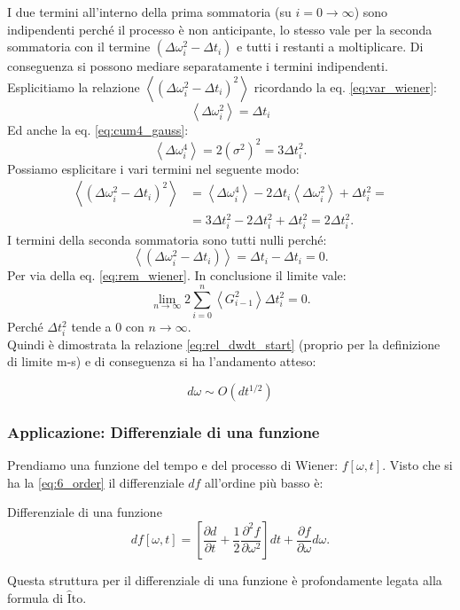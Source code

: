 I due termini all'interno della prima sommatoria (su $i = 0 \to \infty$) sono indipendenti perché il processo è non anticipante, lo stesso vale per la seconda sommatoria con il termine $\left(\Delta\omega^2_i - \Delta t_i\right)$ e tutti i restanti a moltiplicare. Di conseguenza si possono mediare separatamente i termini indipendenti.\\
Esplicitiamo la relazione $\left<\left(\Delta\omega_i^2 - \Delta  t_i\right)^2\right>$ ricordando la eq. \ref{eq:var_wiener}:
\begin{equation}
    \left<\Delta\omega_i^2\right> = \Delta t_i
    \label{eq:rem_wiener}
\end{equation}
Ed anche la eq. \ref{eq:cum4_gauss}:
\[
\left<\Delta\omega^4_i\right> = 2\left(\sigma^2\right)^2 = 3 \Delta t_i^2
.\] 
Possiamo esplicitare i vari termini nel seguente modo:
\[\begin{aligned}
    \left<\left(\Delta\omega_i^2 -\Delta t_i\right)^2\right> &= \left<\Delta\omega_i^4\right> - 2\Delta t_i\left< \Delta\omega_i^2\right> + \Delta t_i^2 = \\
    &=3\Delta t_i^2 - 2\Delta t_i^2 + \Delta t_i^2 = 2 \Delta t^2_i
.\end{aligned}\]
I termini della seconda sommatoria sono tutti nulli perché:
\[
    \left<\left(\Delta\omega_i^2-\Delta t_i\right)\right> = \Delta t_i - \Delta t_i = 0 
.\] 
Per via della eq. \ref{eq:rem_wiener}. In conclusione il limite vale:
\[
    \lim_{n \to \infty} 2\sum_{i = 0}^{n} \left<G_{i-1}^2\right> \Delta t_i^2 = 0
.\] 
Perché $\Delta t_i^2$ tende a $0$ con $n\to\infty$.\\
Quindi è dimostrata la relazione \ref{eq:rel_dwdt_start} (proprio per la definizione di limite m-s) e di conseguenza si ha l'andamento atteso:
\begin{redbox}{}
    \begin{equation}
	d\omega  \sim O(dt^{1 /2}) \label{eq:6_order}
    \end{equation}
\end{redbox}
\noindent
\subsubsection{Applicazione: Differenziale di una funzione}%
\label{subsub:Applicazione: Differenziale di una funzione}
Prendiamo una funzione del tempo e del processo di Wiener: $f\left[\omega,t\right]$. Visto che si ha la \ref{eq:6_order} il differenziale $df$  all'ordine più basso è:
\begin{bluebox}{Differenziale di una funzione}
    \[
	df\left[\omega,t\right] = \left[\frac{\partial d}{\partial t} + \frac{1}{2}\frac{\partial ^2 f}{\partial \omega^2} \right]dt + \frac{\partial f}{\partial \omega} d\omega
    .\] 
\end{bluebox}
\noindent
Questa struttura per il differenziale di una funzione è profondamente legata alla formula di $\hat{\text{I}}$to.
